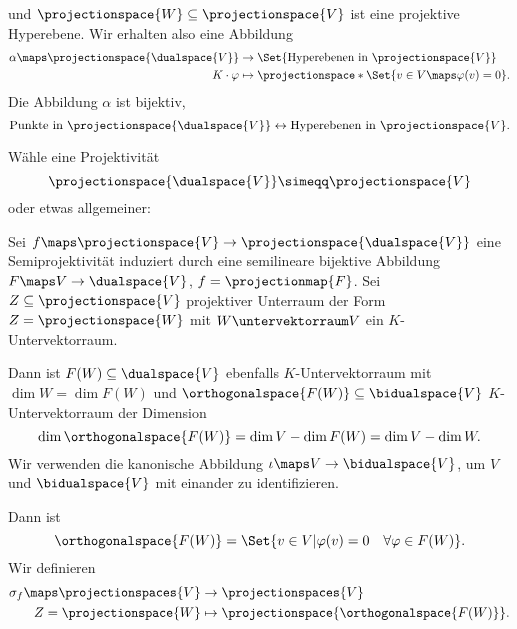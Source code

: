 und \( \projectionspace{W}\subseteq \projectionspace{V} \) ist eine projektive Hyperebene. Wir erhalten also eine Abbildung
\begin{equation*}
  \begin{split}
    \alpha\maps \projectionspace{\dualspace{V}}&\to \Set{\text{Hyperebenen in \( \projectionspace{V} \)}}\\
    K\cdot \varphi&\mapsto \projectionspace*{\Set{v\in V\maps \varphi(v)=0}}.
  \end{split}
\end{equation*}
Die Abbildung \( \alpha \) ist bijektiv, \dh
\begin{equation*}
  \text{Punkte in \( \projectionspace{\dualspace{V}} \)}\leftrightarrow \text{Hyperebenen in \( \projectionspace{V} \)}.
\end{equation*}
\begin{idee*}
  Wähle eine Projektivität
  \begin{equation*}
    \projectionspace{\dualspace{V}}\simeqq \projectionspace{V}
  \end{equation*}
  oder etwas allgemeiner:
  
  Sei \( f\maps \projectionspace{V}\to \projectionspace{\dualspace{V}} \) eine Semiprojektivität induziert durch eine semilineare bijektive Abbildung \( F\maps V\to \dualspace{V} \), \dh \( f=\projectionmap{F} \). Sei \( Z\subseteq \projectionspace{V} \) projektiver Unterraum der Form \( Z=\projectionspace{W} \) mit \( W\untervektorraum V \) ein \( K \)-Untervektorraum.

  Dann ist \( F(W)\subseteq \dualspace{V} \) ebenfalls \( K \)-Untervektorraum mit \( \dim{W}=\dim{F(W)} \) und \( \orthogonalspace{F(W)}\subseteq \bidualspace{V} \) \( K \)-Untervektorraum der Dimension
  \begin{equation*}
    \dim{\orthogonalspace{F(W)}}=\dim{V}-\dim{F(W)}=\dim{V}-\dim{W}.
  \end{equation*}
  Wir verwenden die kanonische Abbildung \( \iota\maps V\to \bidualspace{V} \), um \( V \) und \( \bidualspace{V} \) mit einander zu identifizieren.

  Dann ist 
  \begin{equation*}
    \orthogonalspace{F(W)}=\Set{v\in V|\varphi(v)=0\quad \forall \varphi\in F(W)}.
  \end{equation*}
  Wir definieren
  \begin{equation*}
    \begin{split}
      \sigma_f\maps \projectionspaces{V}&\to\projectionspaces{V}\\
      Z=\projectionspace{W}&\mapsto \projectionspace{\orthogonalspace{F(W)}}.
    \end{split}
  \end{equation*}
\end{idee*}
